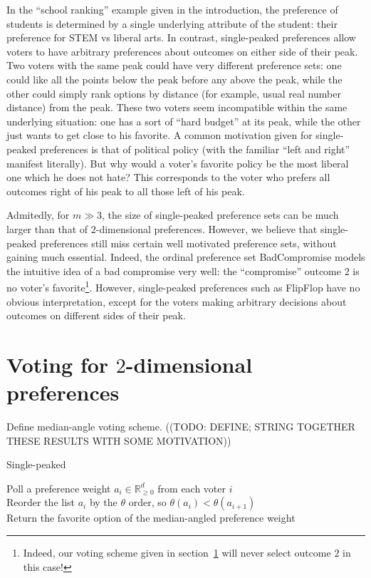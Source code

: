 \documentclass[12pt]{article}
\newcommand{\Rgz}{\mathbb{R}_{\ge 0}}
\newcommand{\1}[1]{\mathds{1}[{#1}]}
\begin{document}
  In the ``school ranking'' example given in the introduction, the preference of
  students is determined by a single underlying attribute of the student:
  their preference for STEM vs liberal arts.
  In contrast, single-peaked preferences allow voters to have arbitrary
  preferences about outcomes on either side of their peak.
  Two voters with the same peak could have very different preference sets:
  one could like all the points below the peak before any above the peak,
  while the other could simply rank options by distance (for example,
  usual real number distance) from the peak.
  These two voters seem incompatible within the same underlying situation:
  one has a sort of ``hard budget'' at its peak, while the other just
  wants to get close to his favorite.
  A common motivation given for single-peaked preferences is that of political
  policy (with the familiar ``left and right'' manifest literally).
  But why would a voter's favorite policy be the most liberal one which he does
  not hate? This corresponds to the voter who prefers all outcomes right of his
  peak to all those left of his peak.

  Admitedly, for $m \gg 3$, the size of single-peaked preference sets can be
  much larger than that of $2$-dimensional preferences.
  However, we believe that single-peaked preferences still miss certain well
  motivated preference sets, without gaining much essential.
  Indeed, the ordinal preference set {\sc BadCompromise} models the intuitive
  idea of a bad compromise very well: the ``compromise'' outcome $2$ is
  no voter's favorite\footnote{
    Indeed, our voting scheme given in section~\ref{sec:voting} will never
    select outcome $2$ in this case!
  }. However, single-peaked preferences such as {\sc FlipFlop} have no obvious
  interpretation, except for the voters making arbitrary decisions about
  outcomes on different sides of their peak.

\section{Voting for $2$-dimensional preferences}
  \label{sec:voting}

  Define median-angle voting scheme.
  ((TODO: DEFINE; STRING TOGETHER THESE RESULTS WITH SOME MOTIVATION))

  Single-peaked 
  \begin{algorithm}
    Poll a preference weight $a_i\in\Rgz^d$ from each voter $i$ \\
    Reorder the list $a_i$ by the $\theta$ order, so 
      $\theta(a_i) < \theta(a_{i+1})$ \\
    Return the favorite option of the median-angled preference weight
  \end{algorithm}
\end{document}
